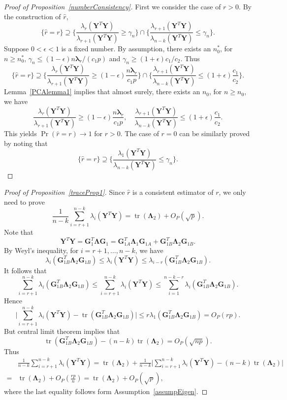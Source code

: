 \documentclass[12pt]{article} %
\DeclareMathOperator{\mytr}{tr}
\newcommand{\bY}{\mathbf{Y}}
\newcommand{\bG}{\mathbf{G}}
\newcommand{\bfsym}[1]{\ensuremath{\boldsymbol{#1}}}
\def\blambda {\bfsym {\lambda}}
\def\bLambda {\bfsym {\Lambda}}
\theoremstyle{definition}
\begin{document}
\begin{appendices}
\begin{proof}[Proof of Proposition~\ref{numberConsistency}]
    First we consider the case of $r>0$. By the construction of $\hat{r}$,
    $$
    \{\hat{r}=r\}\supseteq 
    \{\frac{\lambda_{r}(\bY^T \bY)}{\lambda_{r+1}(\bY^T \bY)}\geq \gamma_n\}
    \cap
    \{\frac{\lambda_{r+1}(\bY^T \bY)}{\lambda_{n-k}(\bY^T \bY)}\leq \gamma_n\}.
    $$
    Suppose $0<\epsilon< 1$ is a fixed number.
    By assumption, there exists an $n_0^*$, for $n\geq n_0^*$, $\gamma_n\leq (1-\epsilon)n\blambda_r/(c_1 p)$ and $\gamma_n\geq (1+\epsilon) c_1/c_2 $. Thus
    $$
    \{\hat{r}=r\}\supseteq 
    \{\frac{\lambda_{r}(\bY^T \bY)}{\lambda_{r+1}(\bY^T \bY)}\geq (1-\epsilon)\frac{n\blambda_r}{c_1 p}\}
    \cap
    \{\frac{\lambda_{r+1}(\bY^T \bY)}{\lambda_{n-k}(\bY^T \bY)}\leq (1+\epsilon) \frac{c_1}{c_2} \}.
    $$
     Lemma~\ref{PCAlemma1} implies that almost surely, there exists an $n_0$, for $n\geq n_0$, we have
    $$\frac{\lambda_r(\bY^T \bY)}{\lambda_{r+1}(\bY^T \bY)}\geq (1-\epsilon)\frac{n\blambda_r}{c_1 p},
    \quad
    \frac{\lambda_{r+1}(\bY^T \bY)}{\lambda_{n-k}(\bY^T \bY)}\leq (1+\epsilon)\frac{c_1}{c_2}.
    $$
    This yields $\Pr(\hat{r}=r)\to 1$ for $r>0$.
    The case of $r=0$ can be similarly proved by noting that
    $$
    \{\hat{r}=r\}\supseteq 
    \{\frac{\lambda_{1}(\bY^T \bY)}{\lambda_{n-k}(\bY^T \bY)}\leq \gamma_n\}.
    $$
\end{proof}

\begin{proof}[Proof of Proposition~\ref{traceProp1}]
    Since $\hat{r}$ is a consistent estimator of $r$, we only need to prove
    $$
    \frac{1 }{n-k}
        \sum_{i=r+1}^{n-k}\lambda_i(\bY^T\bY)
        =\mytr(\bLambda_2)+O_P(\sqrt{p}).
    $$
    Note that
$$
\bY^T \bY =\bG_1^T \bLambda \bG_1
=
\bG_{1A}^T \bLambda_1 \bG_{1A}+
\bG_{1B}^T \bLambda_2 \bG_{1B}.
$$
By Weyl's inequality, for $i=r+1,\ldots, n-k$, we have
$$
\lambda_{i}(\bG_{1B}^T \bLambda_2 \bG_{1B})\leq \lambda_i(\bY^T \bY)\leq \lambda_{i-r}(\bG_{1B}^T \bLambda_2 \bG_{1B}).
$$
It follows that
$$
\sum_{i=r+1}^{n-k}\lambda_{i}(\bG_{1B}^T \bLambda_2 \bG_{1B})\leq \sum_{i=r+1}^{n-k}\lambda_i(\bY^T \bY)\leq \sum_{i=1}^{n-k-r}\lambda_{i}(\bG_{1B}^T \bLambda_2 \bG_{1B}).
$$
Hence
$$
 \big|\sum_{i=r+1}^{n-k}\lambda_i(\bY^T \bY)- \mytr(\bG_{1B}^T \bLambda_2 \bG_{1B})\big|\leq r \lambda_1(\bG_{1B}^T \bLambda_2 \bG_{1B})=O_P(rp).
$$
But central limit theorem implies that
$$\mytr(\bG_{1B}^T \bLambda_2 \bG_{1B})-(n-k)\mytr(\bLambda_2)%
=O_P(\sqrt{np}).$$
Thus
$$
    \begin{aligned}
        &\frac{1}{n-k}\sum_{i=r+1}^{n-k}\lambda_i (\bY^T \bY)
        =\mytr(\bLambda_2)+
\frac{1}{n-k}\big|\sum_{i=r+1}^{n-k}\lambda_i(\bY^T \bY)- (n-k)\mytr(\bLambda_2)\big|\\
        =&\mytr(\bLambda_2)+O_P(\frac{rp}{n})
        =\mytr(\bLambda_2)+O_P(\sqrt{p}),
    \end{aligned}
$$
    where the last equality follows form Assumption~\ref{assumpEigen}.
\end{proof}


\end{appendices}
\end{document}
